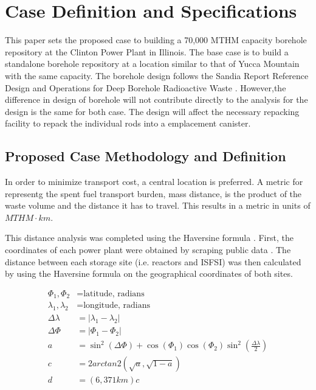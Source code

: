 \section{Case Definition and Specifications}

This paper sets the proposed case to building a 70,000 \gls{MTHM} capacity borehole
 repository at the Clinton Power Plant in Illinois. The base case is to build a
  standalone borehole repository at a location similar to that of Yucca Mountain with
   the same capacity. The borehole design follows the Sandia Report Reference Design
    and Operations for Deep Borehole Radioactive Waste \cite{arnold_reference_2011}.
     However,the difference in design of borehole will not contribute directly
     to the analysis for the design is the same for both case. The design will
     affect the necessary repacking facility to repack the individual rods into
     a emplacement canister.

\subsection{Proposed Case Methodology and Definition}
 In order to minimize transport cost, a central location is preferred. A metric 
 for representg the spent fuel transport burden, mass distance, is the product 
 of the waste volume and the distance it has to travel. This results in a 
 metric in units of $MTHM\cdot km$. 
 
 This distance analysis was completed using the Haversine formula 
 \cite{shumaker_astronomical_1984}. First, the 
 coordinates of each power plant were obtained by scraping public data 
 \cite{wikipedia}.  The distance between each storage site (i.e. reactors and 
 \gls{ISFSI}) was then calculated by using the Haversine formula on the 
 geographical coordinates of both sites. 

 \begin{align} 
         \Phi_1,\Phi_2&= \mbox{latitude, radians}\\
         \lambda_1,\lambda_2 &= \mbox{longitude, radians}\\
         \Delta\lambda &= \left|\lambda_1 - \lambda_2\right|\\
         \Delta\Phi &= \left|\Phi_1 - \Phi_2\right|\\
         a&=\sin^2(\Delta\Phi)+\cos(\Phi_1)\cos(\Phi_2)\sin^2{\left(\frac{\Delta\lambda}{2}\right)}\\
         c &= 2arctan2(\sqrt{a},\sqrt{1-a})\\
         d &=  (6,371km)c
 \end{align}


